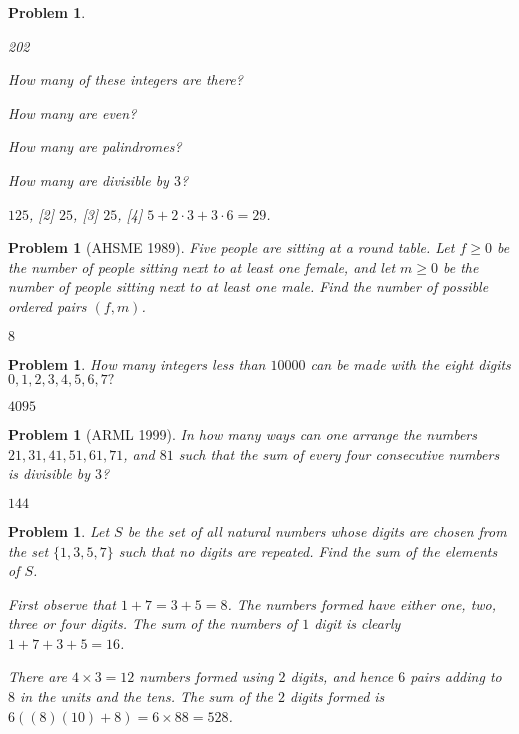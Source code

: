 \documentclass[11pt, openany]{book}
\theoremstyle{change} \theoremheaderfont{\blue\sffamily\bfseries}
\newtheorem{pro}[thm]{Problem}
\theoremstyle{nonumberplain} \theoremheaderfont{\sffamily\bfseries}
\newcommand{\í}{\'{\i}}
\begin{document}
\begin{multicols}{2}
\begin{pro}
\begin{dingautolist}{202}
\item How many of these integers are there? \item How many are
even? \item How many are palindromes? \item How many are divisible
by $3$?
\end{dingautolist}
\begin{answer} [1] $125$, [2] $25$, [3] $25$, [4] $5 + 2\cdot 3+  3\cdot 6
=29$.
\end{answer}
    \end{pro}
      \begin{pro}[AHSME 1989] Five people are sitting at a round table.
Let $f \geq 0$ be the number of people sitting next to at least one
female, and let $m \geq 0$ be the number of people sitting next to
at least one male. Find the number of possible ordered pairs $(f,
m)$. \begin{answer} $8$
\end{answer}
   \end{pro}
     \begin{pro} How many integers less than $10000$ can be made with the eight
digits $0, 1, 2, 3, 4, 5, 6, 7?$ \begin{answer} $4095$

\end{answer}
 \end{pro}
         \begin{pro}[ARML 1999]
In how many ways can one arrange the numbers $21, 31, 41, 51, 61,
71$, and $81$ such that the sum of every four consecutive numbers is
divisible by $3$?
\begin{answer}$144 $
\end{answer}
\end{pro}
\begin{pro}
Let $S$ be the set of all natural numbers whose digits are chosen
from the set $\{1, 3, 5, 7\}$ such that no digits are repeated. Find
the sum of the elements of $S$.\begin{answer} First observe that $1
+ 7 = 3 + 5 = 8$. The numbers formed have either one, two, three or
four digits. The sum of the numbers of $1$ digit is clearly $1 + 7 +
3 + 5 = 16$.

\bigskip

There are $4\times 3 = 12$ numbers formed using $2$ digits, and
hence $6$ pairs adding to $8$ in the units and the tens. The sum of
the $2$ digits formed is $6((8)(10) + 8) = 6\times 88 = 528$.


\end{answer}
\end{pro}
\end{multicols}
\end{document}
